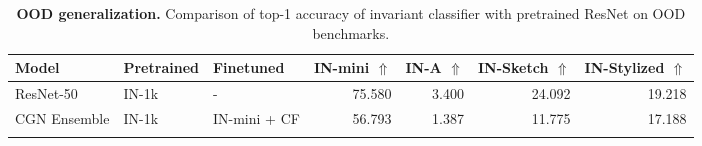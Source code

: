 
\begin{table}[H]
    \centering
    \footnotesize
    \captionsetup{font=footnotesize,skip=1mm}
    \caption{\textbf{OOD generalization.} Comparison of top-1 accuracy of invariant classifier with pretrained ResNet on OOD benchmarks.}
    \label{tab:ood}

\begin{tabular}{@{}lllrrrr@{}}
\toprule
\textbf{Model} & \textbf{Pretrained} & \textbf{Finetuned} & \textbf{IN-mini} $\Uparrow$ & \textbf{IN-A} $\Uparrow$ & \textbf{IN-Sketch} $\Uparrow$ & \textbf{IN-Stylized} $\Uparrow$ \\ \midrule
ResNet-50 & IN-1k & - & 75.580 & 3.400 & 24.092 &  19.218               \\
CGN Ensemble & IN-1k & IN-mini + CF & 56.793 & 1.387 & 11.775 &  17.188                \\
\arrayrulecolor{black}\bottomrule
\end{tabular}
\end{table}
